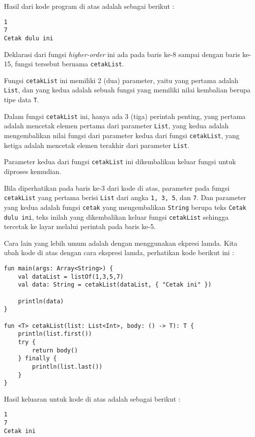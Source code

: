 Hasil dari kode program di atas adalah sebagai berikut :

\begin{lstlisting}
1
7
Cetak dulu ini
\end{lstlisting}

Deklarasi dari fungsi \textit{higher-order} ini ada pada baris ke-8 sampai dengan baris ke-15, fungsi tersebut bernama \texttt{cetakList}. 

Fungsi \texttt{cetakList} ini memiliki 2 (dua) parameter, yaitu yang pertama adalah \texttt{List}, dan yang kedua adalah sebuah fungsi yang memiliki nilai kembalian berupa tipe data \texttt{T}.

Dalam fungsi \texttt{cetakList} ini, hanya ada 3 (tiga) perintah penting, yang pertama adalah mencetak elemen pertama dari parameter \texttt{List}, yang kedua adalah mengembalikan nilai fungsi dari parameter kedua dari fungsi \texttt{cetakList}, yang ketiga adalah mencetak elemen terakhir dari parameter \texttt{List}.

Parameter kedua dari fungsi \texttt{cetakList} ini dikembalikan keluar fungsi untuk diproses kemudian. 

Bila diperhatikan pada baris ke-3 dari kode di atas, parameter pada fungsi \texttt{cetakList} yang pertama berisi \texttt{List} dari angka \texttt{1, 3, 5}, dan \texttt{7}. Dan parameter yang kedua adalah fungsi \texttt{cetak} yang mengembalikan \texttt{String} berupa teks \texttt{Cetak dulu ini}, teks inilah yang dikembalikan keluar fungsi \texttt{cetakList} sehingga tercetak ke layar melalui perintah pada baris ke-5.

Cara lain yang lebih umum adalah dengan menggunakan ekpresi lamda. Kita ubah kode di atas dengan cara ekspresi lamda, perhatikan kode berikut ini :

\begin{lstlisting}
fun main(args: Array<String>) {
	val dataList = listOf(1,3,5,7)
	val data: String = cetakList(dataList, { "Cetak ini" })
	
	println(data)
}

fun <T> cetakList(list: List<Int>, body: () -> T): T {
	println(list.first())
	try {
		return body()
	} finally {
		println(list.last())
	}
}
\end{lstlisting}

Hasil keluaran untuk kode di atas adalah sebagai berikut :

\begin{lstlisting}
1
7
Cetak ini
\end{lstlisting}

